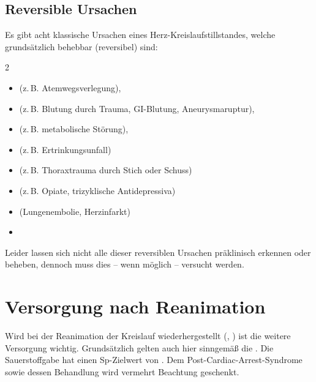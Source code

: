 \subsection{Reversible Ursachen}

Es gibt acht klassische Ursachen eines
Herz-Kreislaufstillstandes, welche grundsätzlich behebbar
(reversibel) sind:

\begin{multicols}{2}
\TableBaseModification
\begin{itemize}
  \item {}

  (z.\,B. Atemwegsverlegung),
  \item {}

  (z.\,B. Blutung durch Trauma,   GI-Blutung, Aneurysmaruptur),
  \item {}

  (z.\,B. metabolische Störung),
  \item {}

  (z.\,B. Ertrinkungsunfall)
  \item {}

  (z.\,B. Thoraxtrauma durch Stich oder Schuss)
  \item {}

  (z.\,B. Opiate, trizyklische Antidepressiva)
  \item {}

  (Lungenembolie, Herzinfarkt)
  \item {}
\end{itemize}
\end{multicols}


\noindent {} 

\bigskip

Leider lassen sich nicht alle dieser reversiblen Ursachen
präklinisch erkennen oder beheben, dennoch muss dies -- wenn
möglich -- versucht werden.


\section{Versorgung nach Reanimation}

Wird bei der Reanimation der Kreislauf wiederhergestellt
(, ) ist
die weitere Versorgung wichtig. Grundsätzlich gelten auch
hier sinngemäß die {\TxMassVit}. Die Sauerstoffgabe hat
einen Sp-Zielwert von \PC*.
Dem Post-Cardiac-Arrest-Syndrome sowie dessen Behandlung
wird vermehrt Beachtung geschenkt.


